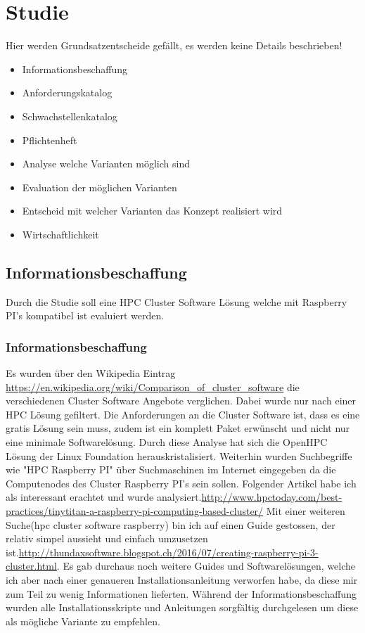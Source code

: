 \section{Studie} 
\label{sec:Studie}
Hier werden Grundsatzentscheide gefällt, es werden keine Details beschrieben!
\begin{itemize}
	\item Informationsbeschaffung
	\item Anforderungskatalog
	\item Schwachstellenkatalog
	\item Pflichtenheft
	\item Analyse welche Varianten möglich sind
	\item Evaluation der möglichen Varianten
	\item Entscheid mit welcher Varianten das Konzept realisiert wird
	\item Wirtschaftlichkeit
\end{itemize}


\subsection{Informationsbeschaffung}
Durch die Studie soll eine HPC Cluster Software Lösung welche mit Raspberry PI's kompatibel ist evaluiert werden.

\subsubsection{Informationsbeschaffung}
Es wurden über den Wikipedia Eintrag \hyperref[Wikipedia Eintrag]{https://en.wikipedia.org/wiki/Comparison\_of\_cluster\_software} die verschiedenen Cluster Software Angebote verglichen. Dabei wurde nur nach einer HPC Lösung gefiltert. Die Anforderungen an die Cluster Software ist, dass es eine gratis Lösung sein muss, zudem ist ein komplett Paket erwünscht und nicht nur eine minimale Softwarelösung. Durch diese Analyse hat sich die OpenHPC Lösung der Linux Foundation herauskristalisiert. Weiterhin wurden Suchbegriffe wie "HPC Raspberry PI" über Suchmaschinen im Internet eingegeben da die Computenodes des Cluster Raspberry PI's sein sollen. Folgender Artikel habe ich als interessant erachtet und wurde analysiert.\hyperref[TinyTitan]{http://www.hpctoday.com/best-practices/tinytitan-a-raspberry-pi-computing-based-cluster/}
Mit einer weiteren Suche(hpc cluster software raspberry) bin ich auf einen Guide gestossen, der relativ simpel aussieht und einfach umzusetzen ist.\hyperref[Eigenbau]{http://thundaxsoftware.blogspot.ch/2016/07/creating-raspberry-pi-3-cluster.html}. Es gab durchaus noch weitere Guides und Softwarelösungen, welche ich aber nach einer genaueren Installationsanleitung verworfen habe, da diese mir zum Teil zu wenig Informationen lieferten. Während der Informationsbeschaffung wurden alle Installationsskripte und Anleitungen sorgfältig durchgelesen um diese als mögliche Variante zu empfehlen.

